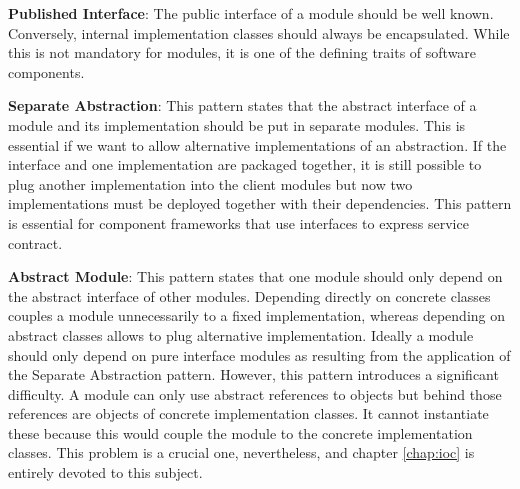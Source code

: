 \textbf{Published Interface}:
The public interface of a module should be well known. Conversely, internal implementation classes
should always be encapsulated. While this is not mandatory for modules, it is one of the defining
traits of software components.

\textbf{Separate Abstraction}:
This pattern states that the abstract interface of a module and its implementation should be put in separate modules.
This is essential if we want to allow alternative implementations of an abstraction. If the interface and one implementation
are packaged together, it is still possible to plug another implementation into the client modules but now two implementations
must be deployed together with their dependencies. This pattern is essential for component frameworks that use interfaces to express service contract.

\textbf{Abstract Module}:
This pattern states that one module should only depend on the abstract interface of other modules. Depending directly on
concrete classes couples a module unnecessarily to a fixed implementation, whereas depending on abstract classes allows
to plug alternative implementation. Ideally a module should only depend on pure interface modules as resulting from the
application of the Separate Abstraction pattern. However, this pattern introduces a significant difficulty. A module
can only use abstract references to objects but behind those references are objects of concrete implementation classes.
It cannot instantiate these because this would couple the module to the concrete implementation classes. This problem
is a crucial one, nevertheless, and chapter \ref{chap:ioc} is entirely devoted to this subject.
